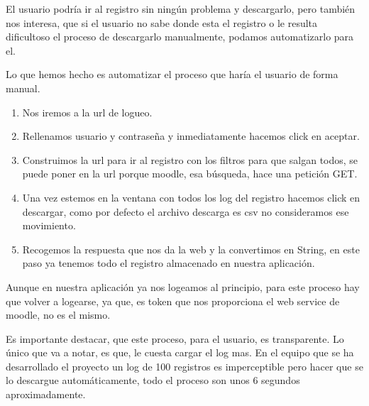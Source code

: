 El usuario podría ir al registro sin ningún problema y descargarlo, pero también nos interesa, que si el usuario no sabe donde esta el registro o le resulta dificultoso el proceso de descargarlo manualmente, podamos automatizarlo para el.
 
Lo que hemos hecho es automatizar el proceso que haría el usuario de forma manual. 
 \begin{enumerate}
 	\item 
 	Nos iremos a la url de logueo.
 	\item 
 	Rellenamos usuario y contraseña y inmediatamente hacemos click en aceptar.
 	\item 
 	Construimos la url para ir al registro con los filtros para que salgan todos, se puede poner en la url porque moodle, esa búsqueda, hace una petición GET.
 	\item 
 	Una vez estemos en la ventana con todos los log del registro hacemos click en descargar, como por defecto el archivo descarga es csv no consideramos ese movimiento.
 	\item 
 	Recogemos la respuesta que nos da la web y la convertimos en String, en este paso ya tenemos todo el registro almacenado en nuestra aplicación.
 \end{enumerate}
 
Aunque en nuestra aplicación ya nos logeamos al principio, para este proceso hay que volver a logearse, ya que, es token que nos proporciona el web service de moodle, no es el mismo.

Es importante destacar, que este proceso, para el usuario, es transparente. Lo único que va a notar, es que, le cuesta cargar el log mas. En el equipo que se ha desarrollado el proyecto un log de 100 registros es imperceptible pero hacer que se lo descargue automáticamente, todo el proceso son unos 6 segundos aproximadamente.
 